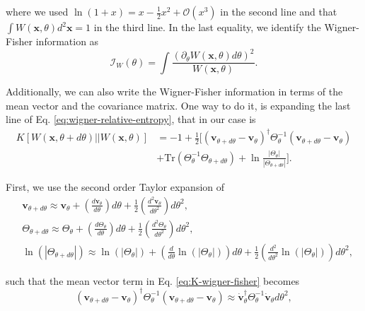\begin{apendicesenv}
\noindent where we used $\ln (1+x) = x - \frac{1}{2}x^2 + \mathcal{O}(x^3)$ in the second line and that $\int W(\mathbf{x}, \theta) d^2 \mathbf{x} = 1$ in the third line. In the last equality, we identify the Wigner-Fisher information as 
\begin{equation}
    \mathcal{I}_W(\theta) = \int \frac{(\partial_\theta W(\mathbf{x}, \theta) d\theta)^2}{W(\mathbf{x}, \theta)}.
\end{equation}

\noindent Additionally, we can also write the Wigner-Fisher information in terms of the mean vector and the covariance matrix. One way to do it, is expanding the last line of Eq. \eqref{eq:wigner-relative-entropy}, that in our case is
\begin{equation}
    \begin{split}
        K[W(\mathbf{x}, \theta+d\theta) || W(\mathbf{x}, \theta)] &= -1 + \frac{1}{2} \Big[(\mathbf{v}_{\theta+d\theta} - \mathbf{v}_\theta)^\dagger \Theta_\theta^{-1} (\mathbf{v}_{\theta+d\theta} - \mathbf{v}_\theta) \\
        &+ \text{Tr}(\Theta_\theta^{-1} \Theta_{\theta+d\theta}) + \ln \frac{|\Theta_\theta|}{|\Theta_{\theta+d\theta}|} \Big].
    \end{split}
    \label{eq:K-wigner-fisher}
\end{equation}

\noindent First, we use the second order Taylor expansion of
\begin{align}
    &\mathbf{v}_{\theta+d\theta} \approx \mathbf{v}_{\theta} + \left(\frac{d\mathbf{v}_{\theta}}{d\theta}\right)d\theta + \frac{1}{2}\left(\frac{d^2\mathbf{v}_{\theta}}{d\theta^2}\right)d\theta^2 , \\
    &\Theta_{\theta+d\theta} \approx \Theta_{\theta} + \left(\frac{d\Theta_{\theta}}{d\theta}\right)d\theta + \frac{1}{2}\left(\frac{d^2\Theta_{\theta}}{d\theta^2}\right)d\theta^2 , \\
    &\ln( |\Theta_{\theta+d\theta}|) \approx \ln( |\Theta_{\theta}|) + \left(\frac{d}{d\theta} \ln( |\Theta_{\theta}|)\right)d\theta + \frac{1}{2}\left(\frac{d^2}{d\theta^2} \ln( |\Theta_{\theta}|) \right)d\theta^2,
    \label{eq:expansao-ln-Theta}
\end{align}

\noindent such that the mean vector term in Eq. \eqref{eq:K-wigner-fisher} becomes
\begin{equation}
    (\mathbf{v}_{\theta+d\theta} - \mathbf{v}_\theta)^\dagger \Theta_\theta^{-1} (\mathbf{v}_{\theta+d\theta} - \mathbf{v}_\theta) \approx \dot{\mathbf{v}}_{\theta}^\dagger \Theta_\theta^{-1} \dot{\mathbf{v}}_{\theta} d\theta^2,
\end{equation}


\end{apendicesenv}

